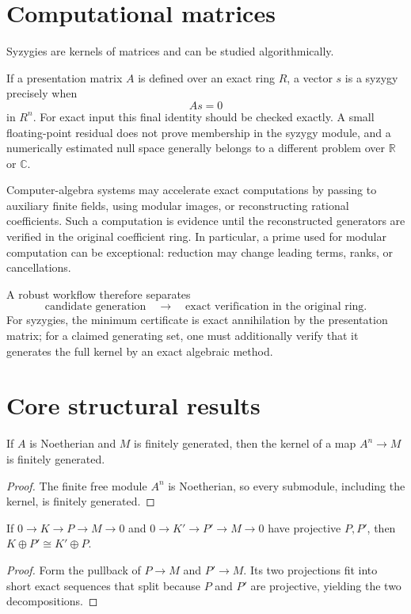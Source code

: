 \section{Computational matrices}
Syzygies are kernels of matrices and can be studied algorithmically.

\begin{remark}
If a presentation matrix \(A\) is defined over an exact ring \(R\), a vector
\(s\) is a syzygy precisely when
\[
As=0
\]
in \(R^n\).  For exact input this final identity should be checked exactly.
A small floating-point residual does not prove membership in the syzygy
module, and a numerically estimated null space generally belongs to a
different problem over \(\mathbb R\) or \(\mathbb C\).

Computer-algebra systems may accelerate exact computations by passing to
auxiliary finite fields, using modular images, or reconstructing rational
coefficients.  Such a computation is evidence until the reconstructed
generators are verified in the original coefficient ring.  In particular,
a prime used for modular computation can be exceptional: reduction may change
leading terms, ranks, or cancellations.

A robust workflow therefore separates
\[
\text{candidate generation}
\quad\longrightarrow\quad
\text{exact verification in the original ring}.
\]
For syzygies, the minimum certificate is exact annihilation by the presentation
matrix; for a claimed generating set, one must additionally verify that it
generates the full kernel by an exact algebraic method.
\end{remark}

\section{Core structural results}

\begin{theorem}\label{thm:v24-01}
If $A$ is Noetherian and $M$ is finitely generated, then the kernel of a map $A^n\to M$ is finitely generated.
\begin{proof}
The finite free module $A^n$ is Noetherian, so every submodule, including the kernel, is finitely generated.
\end{proof}
\end{theorem}

\begin{theorem}\label{thm:v24-02}
If $0\to K\to P\to M\to0$ and $0\to K'\to P'\to M\to0$ have projective $P,P'$, then $K\oplus P'\cong K'\oplus P$.
\begin{proof}
Form the pullback of $P\to M$ and $P'\to M$. Its two projections fit into short exact sequences that split because $P$ and $P'$ are projective, yielding the two decompositions.
\end{proof}
\end{theorem}

